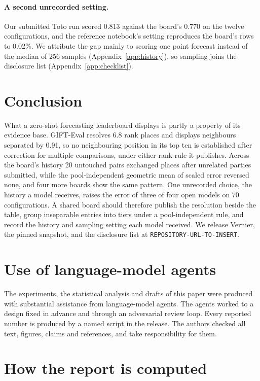 \documentclass{article}
\newcommand{\supplementurl}{\texttt{REPOSITORY-URL-TO-INSERT}}
\begin{document}
\paragraph{A second unrecorded setting.} Our submitted Toto run scored 0.813 against the
board's 0.770 on the twelve configurations, and the reference notebook's setting reproduces
the board's rows to 0.02\%. We attribute the gap mainly to scoring one point forecast instead
of the median of 256 samples (Appendix~\ref{app:history}), so sampling joins the disclosure list (Appendix~\ref{app:checklist}).

\section{Conclusion}

What a zero-shot forecasting leaderboard displays is partly a property of its evidence base.
GIFT-Eval resolves 6.8 rank places and displays
neighbours separated by 0.91, so no neighbouring position in its top ten is established after
correction for multiple comparisons, under either rank rule it publishes. Across the board's
history 20 untouched pairs exchanged places after unrelated parties submitted, while the
pool-independent geometric mean of scaled error reversed none, and four more boards show the
same pattern. One unrecorded choice, the history a model receives, raises the error of three
of four open models on 70 configurations. A shared board should therefore publish the
resolution beside the table,
group inseparable entries into tiers under a pool-independent rule, and record the history and
sampling setting each model received. We
release Vernier, the pinned snapshot, and the disclosure list at \supplementurl.




\section*{Use of language-model agents}
The experiments, the statistical analysis and drafts of this paper were produced with
substantial assistance from language-model agents. The agents worked to a design fixed in
advance and through an adversarial review loop. Every reported number is produced by a named
script in the release. The authors checked all text, figures, claims and references, and
take responsibility for them.

\appendix

\section{How the report is computed}
\label{app:method}
\end{document}
